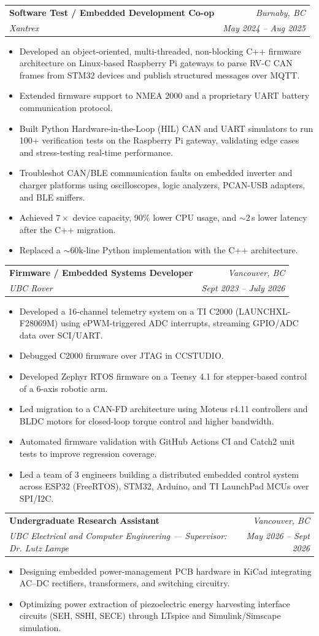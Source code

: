 \documentclass[letterpaper,11pt]{article}
\makeatletter
\newcommand{\resumeItem}[1]{
  \item\small{
    {#1 \vspace{-2pt}}
  }
}
\newcommand{\resumeSubheading}[4]{
  \vspace{-2pt}\item
    \begin{tabular*}{0.97\textwidth}[t]{l@{\extracolsep{\fill}}r}
      \textbf{#1} & \textit{\small #4} \\
      \textit{\small#3} & \textit{\small #2} \\
    \end{tabular*}\vspace{-7pt}
}
\newcommand{\resumeItemListStart}{\begin{itemize}[leftmargin=0.2in]}
\newcommand{\resumeItemListEnd}{\end{itemize}\vspace{-5pt}}
\makeatother
\begin{document}
\resumeSubheading
      {Software Test / Embedded Development Co-op}{May 2024 -- Aug 2025}
      {Xantrex}{Burnaby, BC}
      \resumeItemListStart
        \resumeItem{Developed an object-oriented, multi-threaded, non-blocking C++ firmware architecture on Linux-based Raspberry Pi gateways to parse RV-C CAN frames from STM32 devices and publish structured messages over MQTT.}
        \resumeItem{Extended firmware support to NMEA 2000 and a proprietary UART battery communication protocol.}
        \resumeItem{Built Python Hardware-in-the-Loop (HIL) CAN and UART simulators to run 100+ verification tests on the Raspberry Pi gateway, validating edge cases and stress-testing real-time performance.}
        \resumeItem{Troubleshot CAN/BLE communication faults on embedded inverter and charger platforms using oscilloscopes, logic analyzers, PCAN-USB adapters, and BLE sniffers.}
        \resumeItem{Achieved $7\times$ device capacity, 90\% lower CPU usage, and $\sim$2\,s lower latency after the C++ migration.}
        \resumeItem{Replaced a $\sim$60k-line Python implementation with the C++ architecture.}
      \resumeItemListEnd

    \resumeSubheading
      {Firmware / Embedded Systems Developer}{Sept 2023 -- July 2026}
      {UBC Rover}{Vancouver, BC}
      \resumeItemListStart
        \resumeItem{Developed a 16-channel telemetry system on a TI C2000 (LAUNCHXL-F28069M) using ePWM-triggered ADC interrupts, streaming GPIO/ADC data over SCI/UART.}
        \resumeItem{Debugged C2000 firmware over JTAG in CCSTUDIO.}
        \resumeItem{Developed Zephyr RTOS firmware on a Teensy 4.1 for stepper-based control of a 6-axis robotic arm.}
        \resumeItem{Led migration to a CAN-FD architecture using Moteus r4.11 controllers and BLDC motors for closed-loop torque control and higher bandwidth.}
        \resumeItem{Automated firmware validation with GitHub Actions CI and Catch2 unit tests to improve regression coverage.}
        \resumeItem{Led a team of 3 engineers building a distributed embedded control system across ESP32 (FreeRTOS), STM32, Arduino, and TI LaunchPad MCUs over SPI/I2C.}
      \resumeItemListEnd

    \resumeSubheading
      {Undergraduate Research Assistant}{May 2026 -- Sept 2026}
      {UBC Electrical and Computer Engineering --- Supervisor: Dr. Lutz Lampe}{Vancouver, BC}
      \resumeItemListStart
        \resumeItem{Designing embedded power-management PCB hardware in KiCad integrating AC--DC rectifiers, transformers, and switching circuitry.}
        \resumeItem{Optimizing power extraction of piezoelectric energy harvesting interface circuits (SEH, SSHI, SECE) through LTspice and Simulink/Simscape simulation.}
      \resumeItemListEnd
\end{document}
